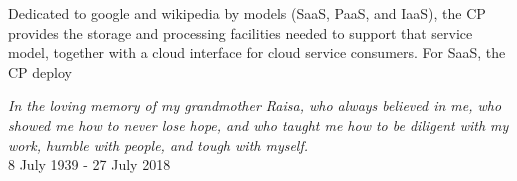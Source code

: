 \documentclass[print]{nuthesis}
\begin{document}
\begin{my_dedication}
Dedicated to google and wikipedia by models (SaaS, PaaS, and IaaS), the CP provides the storage and processing facilities
needed to support that service model, together with a cloud interface for cloud
service consumers. For SaaS, the CP deploy
\end{my_dedication}
\fi

\begin{dedication}
  {\huge \textit{
  In the loving memory of my grandmother Raisa, who always believed in me,   who showed me how to never lose hope, and  who taught me how to be diligent with my work,  humble with people, and tough with myself.
}}\\{\footnotesize 8 July 1939 - 27 July 2018}\\ \ \\
  \vspace{4cm}
\end{dedication}






\begin{acknowledgments}
\end{acknowledgments}


\tableofcontents*

\listoffigures
\listoftables
\mainmatter
\end{document}
